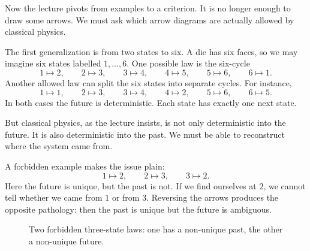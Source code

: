 Now the lecture pivots from examples to a criterion. It is no longer enough to draw some arrows. We must ask which arrow diagrams are actually allowed by classical physics.

The first generalization is from two states to six. A die has six faces, so we may imagine six states labelled \(1,\dots,6\). One possible law is the six-cycle
\begin{equation}
1\mapsto2,\qquad
2\mapsto3,\qquad
3\mapsto4,\qquad
4\mapsto5,\qquad
5\mapsto6,\qquad
6\mapsto1.
\end{equation}
Another allowed law can split the six states into separate cycles.
For instance,
\begin{equation}
1\mapsto1,\qquad
2\mapsto3,\qquad
3\mapsto4,\qquad
4\mapsto2,\qquad
5\mapsto6,\qquad
6\mapsto5.
\end{equation}
In both cases the future is deterministic.
Each state has exactly one next state.

But classical physics, as the lecture insists, is not only deterministic into the future. It is also deterministic into the past. We must be able to reconstruct where the system came from.

A forbidden example makes the issue plain:
\[
1\mapsto2,\qquad 2\mapsto3,\qquad 3\mapsto2.
\]
Here the future is unique, but the past is not. If we find ourselves at \(2\), we cannot tell whether we came from \(1\) or from \(3\). Reversing the arrows produces the opposite pathology: then the past is unique but the future is ambiguous.

\begin{figure}[htbp]
\centering
{}%
\caption{Two forbidden three-state laws: one has a non-unique past, the other a non-unique future.}
\end{figure}

